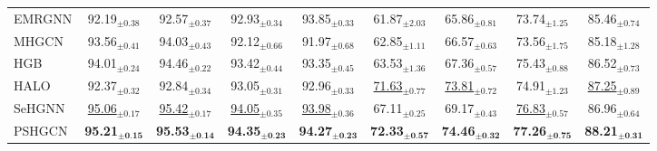 \documentclass{article}
\begin{document}
\begin{table}[t]
{\begin{tabular}{@{}lcccccccc@{}}
EMRGNN &92.19$_{\pm\text{0.38}}$ &92.57$_{\pm\text{0.37}}$ & 92.93$_{\pm\text{0.34}}$ & 93.85$_{\pm\text{0.33}}$ & 61.87$_{\pm\text{2.03}}$ & 65.86$_{\pm\text{0.81}}$ &73.74$_{\pm\text{1.25}}$ &85.46$_{\pm\text{0.74}}$\\

MHGCN &93.56$_{\pm\text{0.41}}$ &94.03$_{\pm\text{0.43}}$ & 92.12$_{\pm\text{0.66}}$ & 91.97$_{\pm\text{0.68}}$ & 62.85$_{\pm\text{1.11}}$ & 66.57$_{\pm\text{0.63}}$ &73.56$_{\pm\text{1.75}}$ &85.18$_{\pm\text{1.28}}$\\

HGB   &94.01$_{\pm\text{0.24}}$ &94.46$_{\pm\text{0.22}}$ & 93.42$_{\pm\text{0.44}}$ & 93.35$_{\pm\text{0.45}}$ & 63.53$_{\pm\text{1.36}}$ & 67.36$_{\pm\text{0.57}}$ &75.43$_{\pm\text{0.88}}$ &86.52$_{\pm\text{0.73}}$ 
\\

HALO   &92.37$_{\pm\text{0.32}}$ &92.84$_{\pm\text{0.34}}$ & 93.05$_{\pm\text{0.31}}$ & 92.96$_{\pm\text{0.33}}$ & \underline{71.63$_{\pm\text{0.77}}$} & \underline{73.81$_{\pm\text{0.72}}$} &74.91$_{\pm\text{1.23}}$
&\underline{87.25$_{\pm\text{0.89}}$} 
\\
SeHGNN &\underline{95.06$_{\pm\text{0.17}}$} &\underline{95.42$_{\pm\text{0.17}}$} & \underline{94.05$_{\pm\text{0.35}}$} & \underline{93.98$_{\pm\text{0.36}}$} & 67.11$_{\pm\text{0.25}}$ & 69.17$_{\pm\text{0.43}}$
&\underline{76.83$_{\pm\text{0.57}}$}
&86.96$_{\pm\text{0.64}}$
\\
PSHGCN &\textbf{95.21}$_{\pm\textbf{0.15}}$ &\textbf{95.53}$_{\pm\textbf{0.14}}$ & \textbf{94.35}$_{\pm\textbf{0.23}}$ & \textbf{94.27}$_{\pm\textbf{0.23}}$ & \textbf{72.33}$_{\pm\textbf{0.57}}$ & \textbf{74.46}$_{\pm\textbf{0.32}}$ &\textbf{77.26}$_{\pm\textbf{0.75}}$
&\textbf{88.21}$_{\pm\textbf{0.31}}$ \\

\bottomrule
\end{tabular}}
\vspace{-6mm}
\label{tb:no_class_res}
\end{table}
\end{document}
